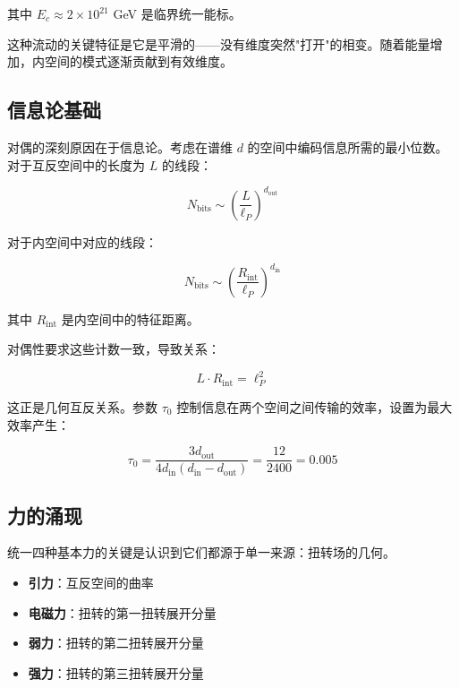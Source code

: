 其中 $E_c \approx 2 \times 10^{21}$ GeV 是临界统一能标。

这种流动的关键特征是它是平滑的——没有维度突然"打开"的相变。随着能量增加，内空间的模式逐渐贡献到有效维度。

\subsection{信息论基础}

对偶的深刻原因在于信息论。考虑在谱维 $d$ 的空间中编码信息所需的最小位数。对于互反空间中的长度为 $L$ 的线段：

\begin{equation}
N_{\text{bits}} \sim \left(\frac{L}{\ell_P}\right)^{d_{\text{out}}}
\end{equation}

对于内空间中对应的线段：

\begin{equation}
N_{\text{bits}} \sim \left(\frac{R_{\text{int}}}{\ell_P}\right)^{d_{\text{in}}}
\end{equation}

其中 $R_{\text{int}}$ 是内空间中的特征距离。

对偶性要求这些计数一致，导致关系：

\begin{equation}
L \cdot R_{\text{int}} = \ell_P^2
\end{equation}

这正是几何互反关系。参数 $\tau_0$ 控制信息在两个空间之间传输的效率，设置为最大效率产生：

\begin{equation}
\tau_0 = \frac{3d_{\text{out}}}{4d_{\text{in}}(d_{\text{in}}-d_{\text{out}})} = \frac{12}{2400} = 0.005
\end{equation}

\subsection{力的涌现}

统一四种基本力的关键是认识到它们都源于单一来源：扭转场的几何。

\begin{itemize}
    \item \textbf{引力}：互反空间的曲率
    \item \textbf{电磁力}：扭转的第一扭转展开分量
    \item \textbf{弱力}：扭转的第二扭转展开分量
    \item \textbf{强力}：扭转的第三扭转展开分量
\end{itemize}

